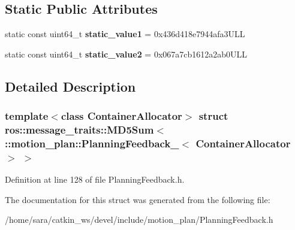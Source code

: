 \subsection*{Static Public Attributes}
\begin{DoxyCompactItemize}
\item 
\mbox{\label{structros_1_1message__traits_1_1MD5Sum_3_01_1_1motion__plan_1_1PlanningFeedback___3_01ContainerAllocator_01_4_01_4_aecd20cc1c793d86a2e7f9acee77c65b2}} 
static const uint64\+\_\+t {\bfseries static\+\_\+value1} = 0x436d418e7944afa3\+U\+LL
\item 
\mbox{\label{structros_1_1message__traits_1_1MD5Sum_3_01_1_1motion__plan_1_1PlanningFeedback___3_01ContainerAllocator_01_4_01_4_a45d126aa15e12e3eaffdb23083c2393f}} 
static const uint64\+\_\+t {\bfseries static\+\_\+value2} = 0x067a7cb1612a2ab0\+U\+LL
\end{DoxyCompactItemize}


\subsection{Detailed Description}
\subsubsection*{template$<$class Container\+Allocator$>$\newline
struct ros\+::message\+\_\+traits\+::\+M\+D5\+Sum$<$ \+::motion\+\_\+plan\+::\+Planning\+Feedback\+\_\+$<$ Container\+Allocator $>$ $>$}



Definition at line 128 of file Planning\+Feedback.\+h.



The documentation for this struct was generated from the following file\+:\begin{DoxyCompactItemize}
\item 
/home/sara/catkin\+\_\+ws/devel/include/motion\+\_\+plan/Planning\+Feedback.\+h\end{DoxyCompactItemize}
